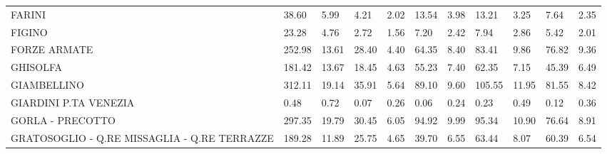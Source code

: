 \begin{table}[H]
{{\begin{tabular}{lp{1.3cm}p{1.3cm}p{1.3cm}p{1.3cm}p{1.3cm}p{1.3cm}p{1.3cm}p{1.3cm}p{1.3cm}p{1.3cm}}
FARINI                                             &                     38.60 &                  5.99 &                        4.21 &                    2.02 &                       13.54 &                    3.98 &                       13.21 &                    3.25 &                      7.64 &                  2.35 \\
FIGINO                                             &                     23.28 &                  4.76 &                        2.72 &                    1.56 &                        7.20 &                    2.42 &                        7.94 &                    2.86 &                      5.42 &                  2.01 \\
FORZE ARMATE                                       &                    252.98 &                 13.61 &                       28.40 &                    4.40 &                       64.35 &                    8.40 &                       83.41 &                    9.86 &                     76.82 &                  9.36 \\
GHISOLFA                                           &                    181.42 &                 13.67 &                       18.45 &                    4.63 &                       55.23 &                    7.40 &                       62.35 &                    7.15 &                     45.39 &                  6.49 \\
GIAMBELLINO                                        &                    312.11 &                 19.14 &                       35.91 &                    5.64 &                       89.10 &                    9.60 &                      105.55 &                   11.95 &                     81.55 &                  8.42 \\
GIARDINI P.TA VENEZIA                              &                      0.48 &                  0.72 &                        0.07 &                    0.26 &                        0.06 &                    0.24 &                        0.23 &                    0.49 &                      0.12 &                  0.36 \\
GORLA - PRECOTTO                                   &                    297.35 &                 19.79 &                       30.45 &                    6.05 &                       94.92 &                    9.99 &                       95.34 &                   10.90 &                     76.64 &                  8.91 \\
GRATOSOGLIO - Q.RE MISSAGLIA - Q.RE TERRAZZE       &                    189.28 &                 11.89 &                       25.75 &                    4.65 &                       39.70 &                    6.55 &                       63.44 &                    8.07 &                     60.39 &                  6.54 \\

\end{tabular}}}
\end{table}
